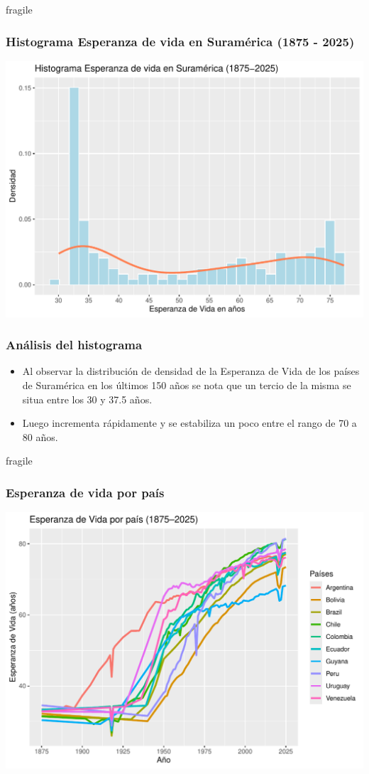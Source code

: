 \documentclass{beamer}
\begin{document}
\begin{frame}{fragile}
\frametitle{Histograma Esperanza de vida en Suramérica (1875 - 2025)}
\includegraphics{presentacion_Parada_G_M8R2-002}
\end{frame}


\begin{frame}[fragile]
\frametitle{Análisis del histograma}
\begin{itemize}
\item<1> Al observar la distribución de densidad de la Esperanza de Vida de los países de Suramérica en los últimos 150 años se nota que un tercio de la misma se situa entre los 30 y 37.5 años.
\item<2> Luego incrementa rápidamente y se estabiliza un poco entre el rango de 70 a 80 años.
\end{itemize}
\end{frame}


\begin{frame}{fragile}
\frametitle{Esperanza de vida por país}
\includegraphics{presentacion_Parada_G_M8R2-003}
\end{frame}
\end{document}
